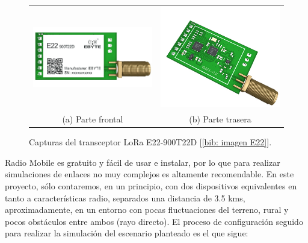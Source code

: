 \documentclass[12pt]{article}
\begin{document}
	\begin{figure}[h]
		\begin{center}
			\begin{tabular}{cc}
				\includegraphics[width=60mm]{img/e22_front.png} &   \includegraphics[width=60mm]{img/e22_rear.png} \\
				(a) Parte frontal & (b) Parte trasera\\[6pt]
			\end{tabular}
			\caption{Capturas del transceptor LoRa E22-900T22D [\ref{bib: imagen E22}].}
			\label{fig: capturas E22.}
		\end{center}
	\end{figure}

	\noindent Radio Mobile es gratuito y fácil de usar e instalar, por lo que para realizar simulaciones de enlaces no muy complejos es altamente recomendable. En este proyecto, sólo contaremos, en un principio, con dos dispositivos equivalentes en tanto a características radio, separados una distancia de 3.5 kms, aproximadamente, en un entorno con pocas fluctuaciones del terreno, rural y pocos obstáculos entre ambos (rayo directo). El proceso de configuración seguido para realizar la simulación del escenario planteado es el que sigue: \\
	
\end{document}

